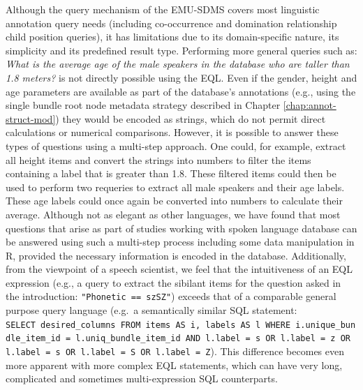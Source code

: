 \documentclass[]{book}
\theoremstyle{definition}
\theoremstyle{definition}
\theoremstyle{definition}
\theoremstyle{remark}
\begin{document}
Although the query mechanism of the EMU-SDMS covers most linguistic
annotation query needs (including co-occurrence and domination
relationship child position queries), it has limitations due to its
domain-specific nature, its simplicity and its predefined result type.
Performing more general queries such as: \emph{What is the average age
of the male speakers in the database who are taller than 1.8 meters?} is
not directly possible using the EQL. Even if the gender, height and age
parameters are available as part of the database's annotations (e.g.,
using the single bundle root node metadata strategy described in Chapter
\ref{chap:annot-struct-mod}) they would be encoded as strings, which do
not permit direct calculations or numerical comparisons. However, it is
possible to answer these types of questions using a multi-step approach.
One could, for example, extract all height items and convert the strings
into numbers to filter the items containing a label that is greater than
1.8. These filtered items could then be used to perform two requeries to
extract all male speakers and their age labels. These age labels could
once again be converted into numbers to calculate their average.
Although not as elegant as other languages, we have found that most
questions that arise as part of studies working with spoken language
database can be answered using such a multi-step process including some
data manipulation in R, provided the necessary information is encoded in
the database. Additionally, from the viewpoint of a speech scientist, we
feel that the intuitiveness of an EQL expression (e.g., a query to
extract the sibilant items for the question asked in the introduction:
\texttt{"Phonetic\ ==\ s\textbar{}z\textbar{}S\textbar{}Z"}) exceeds
that of a comparable general purpose query language (e.g.~a semantically
similar SQL statement:
\texttt{SELECT\ desired\_columns\ FROM\ items\ AS\ i,\ labels\ AS\ l\ WHERE\ i.unique\_bundle\_item\_id\ =\ l.uniq\_bundle\_item\_id\ AND\ l.label\ =\ \textquotesingle{}s\textquotesingle{}\ OR\ l.label\ =\ \textquotesingle{}z\textquotesingle{}\ OR\ l.label\ =\ \textquotesingle{}s\textquotesingle{}\ OR\ l.label\ =\ \textquotesingle{}S\textquotesingle{}\ OR\ l.label\ =\ \textquotesingle{}Z\textquotesingle{}}).
This difference becomes even more apparent with more complex EQL
statements, which can have very long, complicated and sometimes
multi-expression SQL counterparts.
\end{document}
